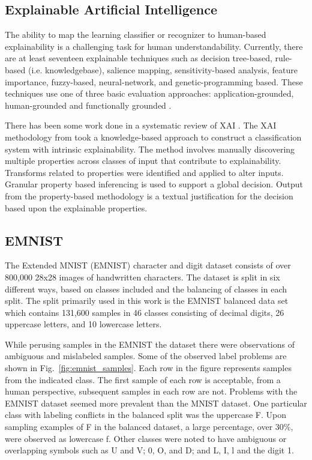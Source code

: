 \documentclass[conference]{IEEEtran}
\begin{document}
\subsection{Explainable Artificial Intelligence}

The ability to map the learning classifier or recognizer to human-based
explainability is a challenging task for human understandability.  Currently,
there are at least seventeen explainable techniques such as decision tree-based,
rule-based (i.e. knowledgebase), salience mapping, sensitivity-based analysis,
feature importance, fuzzy-based, neural-network, and genetic-programming based.
These techniques use one of three basic evaluation approaches:
application-grounded, human-grounded and functionally grounded
\cite{Arrieta2020ExplainableAI,Survey18,Fuzzy19,Hagras18,GP18}.


There has been some work done in a systematic review of XAI
\cite{vilone2020explainable}.  The XAI methodology from \cite{whitten21} took a
knowledge-based approach to construct a classification system with intrinsic
explainability.  The method involves manually discovering multiple properties
across classes of input that contribute to explainability.  Transforms related
to properties were identified and applied to alter inputs.  Granular property
based inferencing is used to support a global decision.  Output from the
property-based methodology is a textual justification for the decision
based upon the explainable properties.

\subsection{EMNIST}

The Extended MNIST (EMNIST)\cite{cohen2017emnist} character and digit dataset
consists of over 800,000 28x28 images of handwritten characters.  The dataset is
split in six different ways, based on classes included and the balancing of
classes in each split.  The split primarily used in this work is the EMNIST
balanced data set which contains 131,600 samples in 46 classes consisting of
decimal digits, 26 uppercase letters, and 10 lowercase letters.

While perusing samples in the EMNIST the dataset there were observations of
ambiguous and mislabeled samples. Some of the observed label problems are shown
in Fig.~\ref{fig:emnist_samples}. Each row in the figure represents samples from
the indicated class.  The first sample of each row is acceptable, from a human
perspective, subsequent samples in each row are not. Problems with the EMNIST dataset
seemed more prevalent than the MNIST dataset. One particular
class with labeling conflicts in the balanced split was the uppercase F.  Upon
sampling examples of F in the balanced dataset, a large percentage, over 30\%,
were observed as lowercase f. Other classes were noted to have ambiguous or
overlapping symbols such as U and V; $0$, O, and D; and L, I, l and the digit 1.
\end{document}
